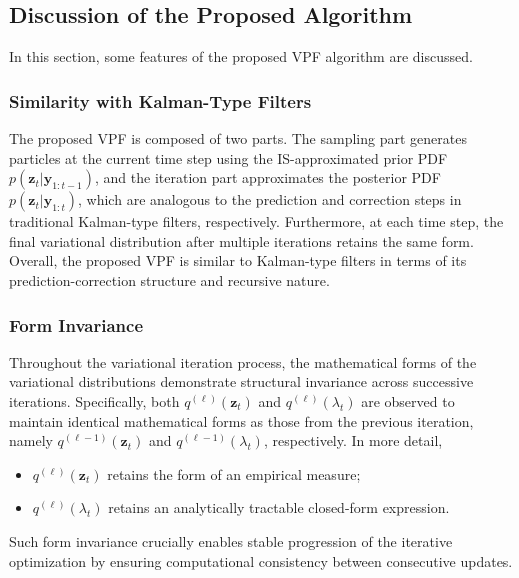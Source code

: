 \documentclass[10pt,twocolumn,twoside]{IEEEtran}
\newcommand{\y}{{ \bm{y} }}
\newcommand{\z}{{ \bm{z} }}
\begin{document}
\subsection{Discussion of the Proposed Algorithm}
In this section, some features of the proposed VPF algorithm are discussed.

\subsubsection{Similarity with Kalman-Type Filters} %
The proposed VPF is composed of two parts. The sampling part generates particles at the current time step using the IS-approximated prior PDF $p(\z_t|\y_{1:t-1})$, and the iteration part approximates the posterior PDF $p(\z_t|\y_{1:t})$, which are analogous to the prediction and correction steps in traditional Kalman-type filters, respectively. Furthermore, at each time step, the final variational distribution after multiple iterations retains the same form. Overall, the proposed VPF is similar to Kalman-type filters in terms of its prediction-correction structure and recursive nature.

\subsubsection{Form Invariance} %
Throughout the variational iteration process, the mathematical forms of the variational distributions demonstrate structural invariance across successive iterations. Specifically, both $q^{(\ell)}(\z_t)$ and $q^{(\ell)}(\lambda_t)$ are observed to maintain identical mathematical forms as those from the previous iteration, namely $q^{(\ell-1)}(\z_t)$ and $q^{(\ell-1)}(\lambda_t)$, respectively. In more detail,
\begin{itemize}
    \item $q^{(\ell)}(\z_t)$ retains the form of an empirical measure;
    \item $q^{(\ell)}(\lambda_t)$ retains an analytically tractable closed-form expression.
\end{itemize}
Such form invariance crucially enables stable progression of the iterative optimization by ensuring computational consistency between consecutive updates.
\end{document}
